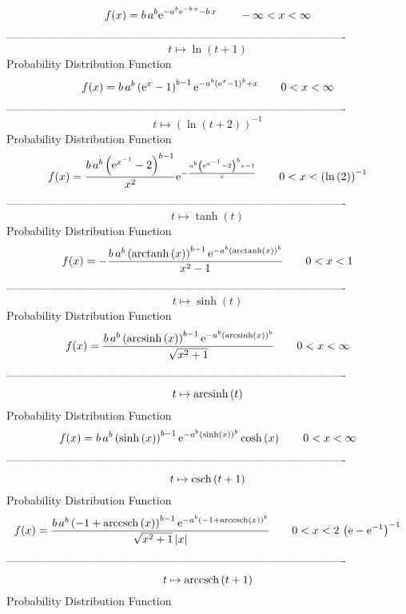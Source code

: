 \documentclass[12pt]{article}
\begin{document}
$$  f(x)=b\,{a}^{b}{{\rm e}^{-{a}^{b}{{\rm e}^{-b\,x}}-b\,x}}
 \qquad-\infty 
 < x < \infty 
$$-------------------------------------------------------------------------------------------  \\$$t\mapsto \ln  \left( t+1 \right) 
$$Probability Distribution Function 
$$  f(x)=b\,{a}^{b} \left( {{\rm e}^{x}}-1 \right) ^{b-1}{{\rm e}^{-{a}^{b}
 \left( {{\rm e}^{x}}-1 \right) ^{b}+x}}
 \qquad0
 < x < \infty 
$$-------------------------------------------------------------------------------------------  \\$$t\mapsto  \left( \ln  \left( t+2 \right)  \right) ^{-1}
$$Probability Distribution Function 
$$  f(x)={\frac {b\,{a}^{b} \left( {{\rm e}^{{x}^{-1}}}-2 \right) ^{b-1}}{{x}^{
2}}{{\rm e}^{-{\frac {{a}^{b} \left( {{\rm e}^{{x}^{-1}}}-2 \right) ^{
b}x-1}{x}}}}}
 \qquad0
 < x <  \left( \ln  \left( 2 \right)  \right) ^{-1}
$$-------------------------------------------------------------------------------------------  \\$$t\mapsto \tanh \left( t \right) 
$$Probability Distribution Function 
$$  f(x)=-{\frac {b\,{a}^{b} \left( {\rm arctanh} \left(x\right) \right) ^{b-1}
{{\rm e}^{-{a}^{b} \left( {\rm arctanh} \left(x\right) \right) ^{b}}}
}{{x}^{2}-1}}
 \qquad0
 < x < 1
$$-------------------------------------------------------------------------------------------  \\$$t\mapsto \sinh \left( t \right) 
$$Probability Distribution Function 
$$  f(x)={\frac {b\,{a}^{b} \left( {\rm arcsinh} \left(x\right) \right) ^{b-1}{
{\rm e}^{-{a}^{b} \left( {\rm arcsinh} \left(x\right) \right) ^{b}}}}{
\sqrt {{x}^{2}+1}}}
 \qquad0
 < x < \infty 
$$-------------------------------------------------------------------------------------------  \\$$t\mapsto {\rm arcsinh} \left(t\right)
$$Probability Distribution Function 
$$  f(x)=b\,{a}^{b} \left( \sinh \left( x \right)  \right) ^{b-1}{{\rm e}^{-{a}
^{b} \left( \sinh \left( x \right)  \right) ^{b}}}\cosh \left( x
 \right) 
 \qquad0
 < x < \infty 
$$-------------------------------------------------------------------------------------------  \\$$t\mapsto {\rm csch} \left(t+1\right)
$$Probability Distribution Function 
$$  f(x)={\frac {b\,{a}^{b} \left( -1+{\rm arccsch} \left(x\right) \right) ^{b-
1}{{\rm e}^{-{a}^{b} \left( -1+{\rm arccsch} \left(x\right) \right) ^{
b}}}}{\sqrt {{x}^{2}+1} \left| x \right| }}
 \qquad0
 < x < 2\, \left( {\rm e}-{{\rm e}^{-1}} \right) ^{-1}
$$-------------------------------------------------------------------------------------------  \\$$t\mapsto {\rm arccsch} \left(t+1\right)
$$Probability Distribution Function 
\end{document}
